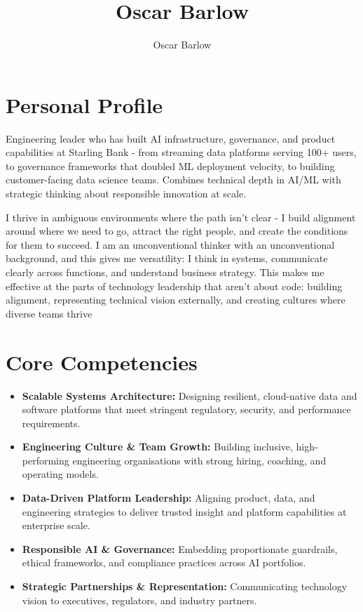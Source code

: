 \documentclass[a4paper]{scrartcl}
\author{Oscar Barlow}
\title{Oscar Barlow}
\date{}
\begin{document}
\maketitle

\section*{Personal Profile}
 { %
  \setlength{\parskip}{6pt plus 2pt minus 1pt}
Engineering leader who has built AI infrastructure, governance, and product capabilities at Starling Bank - from streaming data platforms serving 100+ users, to governance frameworks that doubled ML deployment velocity, to building customer-facing data science teams. Combines technical depth in AI/ML with strategic thinking about responsible innovation at scale.

I thrive in ambiguous environments where the path isn't clear - I build alignment around where we need to go, attract the right people, and create the conditions for them to succeed. I am an unconventional thinker with an unconventional background, and this gives me versatility: I think in systems, communicate clearly across functions, and understand business strategy. This makes me effective at the parts of technology leadership that aren't about code: building alignment, representing technical vision externally, and creating cultures where diverse teams thrive
 } %

\section*{Core Competencies}
\begin{itemize}
	\item \textbf{Scalable Systems Architecture:} Designing resilient, cloud-native data and software platforms that meet stringent regulatory, security, and performance requirements.
	\item \textbf{Engineering Culture \& Team Growth:} Building inclusive, high-performing engineering organisations with strong hiring, coaching, and operating models.
	\item \textbf{Data-Driven Platform Leadership:} Aligning product, data, and engineering strategies to deliver trusted insight and platform capabilities at enterprise scale.
	\item \textbf{Responsible AI \& Governance:} Embedding proportionate guardrails, ethical frameworks, and compliance practices across AI portfolios.
		\item \textbf{Strategic Partnerships \& Representation:} Communicating technology vision to executives, regulators, and industry partners.
\end{itemize}
\end{document}
